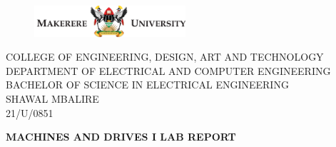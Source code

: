 \documentclass[12pt,a4paper]{report}
\begin{document}
\begin{titlepage}
    \begin{center}
        \begin{figure}[H]
            \centering
            \includegraphics[width=0.5\textwidth]{muk.png}
        \end{figure}

        \vspace{20pt}

        \large COLLEGE OF ENGINEERING, DESIGN, ART AND TECHNOLOGY\\
        \vspace{10pt}
        DEPARTMENT OF ELECTRICAL AND COMPUTER ENGINEERING\\
        \vspace{10pt}
        BACHELOR OF SCIENCE IN ELECTRICAL ENGINEERING\\
        \vspace{10pt}
        SHAWAL MBALIRE\\
        \vspace{10pt}
        21/U/0851\\
        \vspace{20pt}

        \textbf{\Large MACHINES AND DRIVES I LAB REPORT}\\
        \vspace{20pt}


\end{center}
\end{titlepage}
\end{document}
